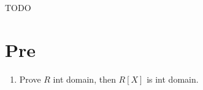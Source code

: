 TODO

\part{Pre}
\begin{enumerate}
    \item Prove \(R\) int domain, then \(R[X]\) is int domain.
\end{enumerate}
